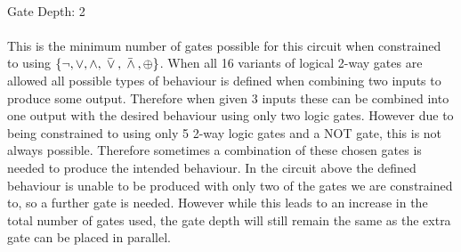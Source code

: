 \documentclass{article}
\newcommand{\lnor}{\bar{\hspace*{0.3em}\lor\hspace*{0.2em}}}
\newcommand{\lnand}{\bar{\hspace*{0.3em}\land\hspace*{0.2em}}}
\newcommand{\lxor}{\oplus}
\begin{document}
\begin{enumerate}
         \\ Gate Depth: 2 \\ \\ This is the minimum number of gates possible for this circuit when constrained to using $\left\{\lnot, \lor, \land, \lnor, \lnand, \lxor \right\}$.
        When all 16 variants of logical 2-way gates are allowed all possible types of behaviour is defined when combining two inputs to produce some output.
        Therefore when given 3 inputs these can be combined into one output with the desired behaviour using only two logic gates.
        However due to being constrained to using only 5 2-way logic gates and a NOT gate, this is not always possible.
        Therefore sometimes a combination of these chosen gates is needed to produce the intended behaviour.
        In the circuit above the defined behaviour is unable to be produced with only two of the gates we are constrained to, so a further gate is needed.
        However while this leads to an increase in the total number of gates used, the gate depth will still remain the same as the extra gate can be placed in parallel.\\ \\


\end{enumerate}
\end{document}
